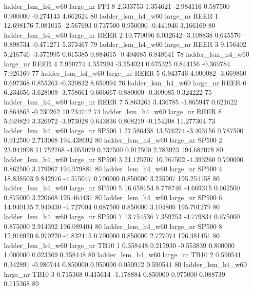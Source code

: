   ladder_lsm_h4_w60   large_nr      PPI                 8  2.333753  1.354621  -2.984116 0.587500 0.900000 -0.274143    4.662624 80
  ladder_lsm_h4_w60   large_nr     REER                 1 12.698176  7.081015  -2.567693 0.737500 0.950000 -0.441946    3.166169 80
  ladder_lsm_h4_w60   large_nr     REER                 2 10.770096  6.032642  -3.108838 0.645570 0.898734 -0.471271    5.373467 79
  ladder_lsm_h4_w60   large_nr     REER                 3  9.156402  5.216746  -3.375995 0.615385 0.884615 -0.404685    6.848641 78
  ladder_lsm_h4_w60   large_nr     REER                 4  7.950774  4.557994  -3.554024 0.675325 0.844156 -0.369784    7.926169 77
  ladder_lsm_h4_w60   large_nr     REER                 5  6.943746  4.000082  -3.669860 0.697368 0.855263 -0.320832    8.650994 76
  ladder_lsm_h4_w60   large_nr     REER                 6  6.234656  3.628009  -3.758661 0.666667 0.880000 -0.309085    9.324222 75
  ladder_lsm_h4_w60   large_nr     REER                 7  5.863261  3.436785  -3.865947 0.621622 0.864865 -0.230262   10.234742 74
  ladder_lsm_h4_w60   large_nr     REER                 8  5.649829  3.326972  -3.973028 0.643836 0.808219 -0.154208   11.277304 73
  ladder_lsm_h4_w60   large_nr    SP500                 1 27.586438 13.576274  -3.403156 0.787500 0.912500  2.713068  194.438692 80
  ladder_lsm_h4_w60   large_nr    SP500                 2 23.941998 11.752768  -4.055079 0.737500 0.912500  2.783923  194.687078 80
  ladder_lsm_h4_w60   large_nr    SP500                 3 21.125207 10.767502  -4.393260 0.700000 0.862500  3.179967  194.979881 80
  ladder_lsm_h4_w60   large_nr    SP500                 4 18.838503  9.842976  -4.575047 0.700000 0.850000  3.235907  195.254158 80
  ladder_lsm_h4_w60   large_nr    SP500                 5 16.658154  8.778746  -4.669315 0.662500 0.875000  3.220668  195.464431 80
  ladder_lsm_h4_w60   large_nr    SP500                 6 14.940135  7.940430  -4.727004 0.687500 0.850000  3.104806  195.701279 80
  ladder_lsm_h4_w60   large_nr    SP500                 7 13.754536  7.359253  -4.779834 0.675000 0.875000  2.914392  196.089404 80
  ladder_lsm_h4_w60   large_nr    SP500                 8 12.916920  6.970220  -4.832445 0.700000 0.850000  2.727074  196.381451 80
  ladder_lsm_h4_w60   large_nr     TB10                 1  0.358448  0.215930  -0.553839 0.800000 1.000000  0.023369    0.358448 80
  ladder_lsm_h4_w60   large_nr     TB10                 2  0.590541  0.342891  -0.980744 0.850000 0.950000  0.050972    0.590541 80
  ladder_lsm_h4_w60   large_nr     TB10                 3  0.715368  0.415614  -1.178884 0.850000 0.975000  0.088739    0.715368 80
